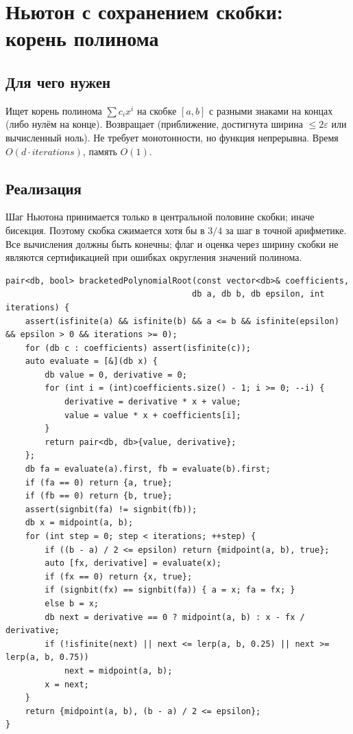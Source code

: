 \fi
\iffalse
\section{Ньютон с сохранением скобки: корень полинома}
\subsection*{Для чего нужен}
Ищет корень полинома $\sum c_i x^i$ на скобке $[a,b]$ с разными знаками
на концах (либо нулём на конце). Возвращает (приближение, достигнута ширина
$\le2\varepsilon$ или вычисленный ноль). Не требует монотонности, но функция
непрерывна. Время $O(d\cdot iterations)$, память $O(1)$.
\subsection*{Реализация}
Шаг Ньютона принимается только в центральной половине скобки; иначе
бисекция. Поэтому скобка сжимается хотя бы в $3/4$ за шаг в точной арифметике.
Все вычисления должны быть конечны; флаг и оценка через ширину скобки
не являются сертификацией при ошибках округления значений полинома.
\begin{lstlisting}[name=optimization_newton]
pair<db, bool> bracketedPolynomialRoot(const vector<db>& coefficients,
                                      db a, db b, db epsilon, int iterations) {
    assert(isfinite(a) && isfinite(b) && a <= b && isfinite(epsilon) && epsilon > 0 && iterations >= 0);
    for (db c : coefficients) assert(isfinite(c));
    auto evaluate = [&](db x) {
        db value = 0, derivative = 0;
        for (int i = (int)coefficients.size() - 1; i >= 0; --i) {
            derivative = derivative * x + value;
            value = value * x + coefficients[i];
        }
        return pair<db, db>{value, derivative};
    };
    db fa = evaluate(a).first, fb = evaluate(b).first;
    if (fa == 0) return {a, true};
    if (fb == 0) return {b, true};
    assert(signbit(fa) != signbit(fb));
    db x = midpoint(a, b);
    for (int step = 0; step < iterations; ++step) {
        if ((b - a) / 2 <= epsilon) return {midpoint(a, b), true};
        auto [fx, derivative] = evaluate(x);
        if (fx == 0) return {x, true};
        if (signbit(fx) == signbit(fa)) { a = x; fa = fx; }
        else b = x;
        db next = derivative == 0 ? midpoint(a, b) : x - fx / derivative;
        if (!isfinite(next) || next <= lerp(a, b, 0.25) || next >= lerp(a, b, 0.75))
            next = midpoint(a, b);
        x = next;
    }
    return {midpoint(a, b), (b - a) / 2 <= epsilon};
}
\end{lstlisting}
